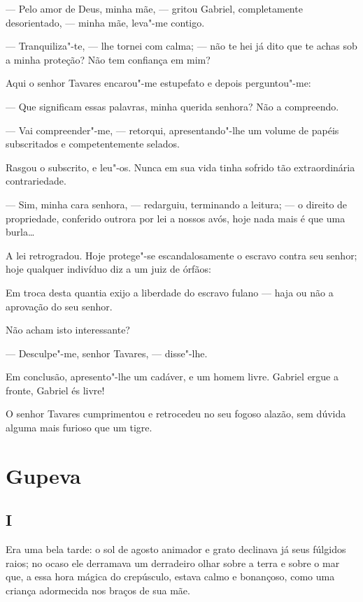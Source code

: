 --- Pelo amor de Deus, minha mãe, --- gritou Gabriel, completamente
desorientado, --- minha mãe, leva"-me contigo.

--- Tranquiliza"-te, --- lhe tornei com calma; --- não te hei já dito que
te achas sob a minha proteção? Não tem confiança em mim?

Aqui o senhor Tavares encarou"-me estupefato e depois perguntou"-me:

--- Que significam essas palavras, minha querida senhora? Não a
compreendo.

--- Vai compreender"-me, --- retorqui, apresentando"-lhe um volume de
papéis subscritados e competentemente selados.

Rasgou o subscrito, e leu"-os. Nunca em sua vida tinha sofrido tão
extraordinária contrariedade.

--- Sim, minha cara senhora, --- redarguiu, terminando a leitura; --- o
direito de propriedade, conferido outrora por lei a nossos avós, hoje
nada mais é que uma burla\ldots{}

A lei retrogradou. Hoje protege"-se escandalosamente o escravo contra seu
senhor; hoje qualquer indivíduo diz a um juiz de órfãos:

Em troca desta quantia exijo a liberdade do escravo fulano --- haja ou
não a aprovação do seu senhor.

Não acham isto interessante?

--- Desculpe"-me, senhor Tavares, --- disse"-lhe.

Em conclusão, apresento"-lhe um cadáver, e um homem livre. Gabriel ergue
a fronte, Gabriel és livre!

O senhor Tavares cumprimentou e retrocedeu no seu fogoso alazão, sem
dúvida alguma mais furioso que um tigre.

\chapter{Gupeva}

\section*{I}

Era uma bela tarde: o sol de agosto animador e grato declinava já seus
fúlgidos raios; no ocaso ele derramava um derradeiro olhar sobre a terra
e sobre o mar que, a essa hora mágica do crepúsculo, estava calmo e
bonançoso, como uma criança adormecida nos braços de sua mãe.

